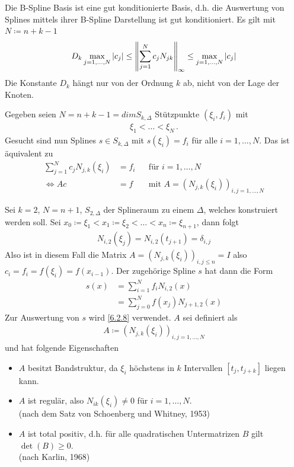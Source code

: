 \begin{Beme}
  Die B-Spline Basis ist eine gut konditionierte Basis, d.h.
  die Auswertung von Splines mittels ihrer B-Spline
  Darstellung ist gut konditioniert.
  Es gilt mit $N\coloneqq n+k-1$
  \begin{gather*}
    D_k \max_{j=1,\ldots, N} |c_j| 
    \leq \left\| \sum^N_{j=1} c_j N_{jk} \right\|_{\infty}
    \leq \max_{j=1,\ldots, N} | c_j|
  \end{gather*}
  Die Konstante $D_k$ hängt nur von der Ordnung $k$ ab, nicht
  von der Lage der Knoten.
\end{Beme}


\label{6.2.13}
  Gegeben seien $N=n+k-1=dimS_{k,\Delta}$ Stützpunkte $(\xi_i,f_i)$
  mit
  \begin{gather*}
    \xi_1<\dots<\xi_N\,.
  \end{gather*}
Gesucht sind nun Splines $s\in S_{k,\Delta}$ 
mit $s(\xi_i)=f_i$ für alle $i=1, \dots, N$.
Das ist äquivalent zu 
\begin{align}
 \sum_{j=1}^N c_jN_{j,k}(\xi_i)&=f_i &&\text{für }i=1,\dots, N
                                       \label{VI.2.8}
  \\\nonumber
  \Leftrightarrow Ac&=f &&\text{mit } A=(N_{j,k}(\xi_i))_{i,j=1,\dots,N}
  \end{align}

\label{6.2.14}
Sei $k=2$, $N=n+1$, $S_{2,\Delta}$ der Splineraum zu einem $\Delta$,
welches konstruiert werden soll.
\label{im6.2.14}
Sei $x_0\coloneqq \xi_1<x_1\coloneqq \xi_2<\dots<x_n\coloneqq
\xi_{n+1}$, dann folgt
\begin{gather*}
  N_{i,2}(\xi_j)=N_{i,2}(t_{j+1})=\delta_{i,j}
\end{gather*}
Also ist in diesem Fall die Matrix $A=(N_{j,k}(\xi_i))_{i,j\leq n}=I$
also $c_i=f_i=f(\xi_i)=f(x_{i-1})$.
Der zugehörige Spline $s$ hat dann die Form
\begin{align*}
  s(x) &= \sum_{i=1}^{N}f_i N_{i,2}(x) \\
       &= \sum_{j=0}^{N}f(x_j)N_{j+1,2}(x)
\end{align*}
Zur Auswertung von $s$ wird \ref{6.2.8} verwendet.
$A$ sei definiert als
\begin{gather*}
  A \coloneqq \left(N_{j,k}(\xi_i)\right)_{i,j=1,\ldots,N}
\end{gather*}
und hat folgende Eigenschaften
\begin{itemize}
\item  $A$ besitzt Bandstruktur, da  $\xi_i$ höchstens in $k$
  Intervallen $[t_j, t_{j+k}]$ liegen kann.
\item $A$ ist regulär, also $N_{ik}(\xi_i)\neq 0$
  für $i=1, \ldots, N$.\\
  (nach dem Satz von Schoenberg und Whitney, 1953)
\item $A$ ist total positiv, d.h. für alle quadratischen
    Untermatrizen $B$ gilt $\det(B)\geq 0$.\\    
    (nach Karlin, 1968)
\end{itemize}

